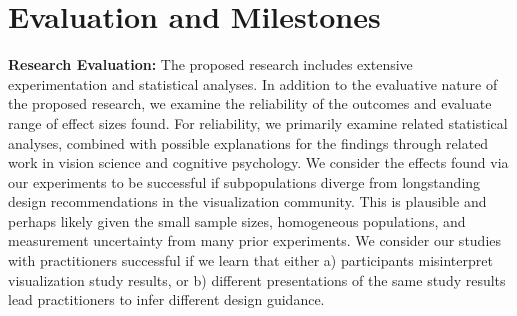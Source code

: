 \documentclass[11pt]{article}
\begin{document}
\section{Evaluation and Milestones}

\noindent\textbf{Research Evaluation:}
The proposed research includes extensive experimentation and statistical analyses.
In addition to the evaluative nature of the proposed research, we examine the reliability of the outcomes and evaluate range of effect sizes found.
For reliability, we primarily examine related statistical analyses, combined with possible explanations for the findings through related work in vision science and cognitive psychology. 
We consider the effects found via our experiments to be successful if subpopulations diverge from longstanding design recommendations in the visualization community.
This is plausible and perhaps likely given the small sample sizes, homogeneous populations, and measurement uncertainty from many prior experiments.
We consider our studies with practitioners successful if we learn that either a) participants misinterpret visualization study results, or b) different presentations of the same study results lead practitioners to infer different design guidance.

\end{document}
